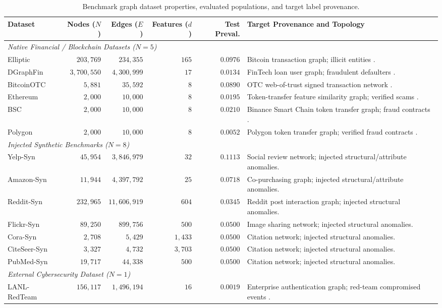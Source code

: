 \documentclass[11pt,a4paper]{article}
\begin{document}
\begin{table}[htbp]
\centering\small
\caption{Benchmark graph dataset properties, evaluated populations, and target label provenance.}
\label{tab:dataset_properties}
\begin{tabularx}{\textwidth}{lrrrrX}\toprule
\textbf{Dataset} & \textbf{Nodes ($N$)} & \textbf{Edges ($E$)} & \textbf{Features ($d$)} & \textbf{Test Preval.} & \textbf{Target Provenance and Topology} \\\midrule
\multicolumn{6}{l}{\textit{Native Financial / Blockchain Datasets ($N=5$)}} \\
Elliptic & $203,769$ & $234,355$ & $165$ & $0.0976$ & Bitcoin transaction graph; illicit entities \cite{weber2019elliptic}. \\
DGraphFin & $3,700,550$ & $4,300,999$ & $17$ & $0.0134$ & FinTech loan user graph; fraudulent defaulters \cite{huang2022dgraph}. \\
BitcoinOTC & $5,881$ & $35,592$ & $8$ & $0.0890$ & OTC web-of-trust signed transaction network \cite{kumar2016edge,snapbitcoinotc}. \\
Ethereum & $2,000$ & $10,000$ & $8$ & $0.0195$ & Token-transfer feature similarity graph; verified scams \cite{luo2024multichain}. \\
BSC & $2,000$ & $10,000$ & $8$ & $0.0210$ & Binance Smart Chain token transfer graph; fraud contracts \cite{luo2024multichain}. \\
Polygon & $2,000$ & $10,000$ & $8$ & $0.0052$ & Polygon token transfer graph; verified fraud contracts \cite{luo2024multichain}. \\\midrule
\multicolumn{6}{l}{\textit{Injected Synthetic Benchmarks ($N=8$)}} \\
Yelp-Syn & $45,954$ & $3,846,979$ & $32$ & $0.1113$ & Social review network; injected structural/attribute anomalies. \\
Amazon-Syn & $11,944$ & $4,397,792$ & $25$ & $0.0718$ & Co-purchasing graph; injected structural/attribute anomalies. \\
Reddit-Syn & $232,965$ & $11,606,919$ & $604$ & $0.0345$ & Reddit post interaction graph; injected structural anomalies. \\
Flickr-Syn & $89,250$ & $899,756$ & $500$ & $0.0500$ & Image sharing network; injected structural anomalies. \\
Cora-Syn & $2,708$ & $5,429$ & $1,433$ & $0.0500$ & Citation network; injected structural anomalies. \\
CiteSeer-Syn & $3,327$ & $4,732$ & $3,703$ & $0.0500$ & Citation network; injected structural anomalies. \\
PubMed-Syn & $19,717$ & $44,338$ & $500$ & $0.0500$ & Citation network; injected structural anomalies. \\\midrule
\multicolumn{6}{l}{\textit{External Cybersecurity Dataset ($N=1$)}} \\
LANL-RedTeam & $156,117$ & $1,496,194$ & $16$ & $0.0019$ & Enterprise authentication graph; red-team compromised events \cite{kent2015cyberdata}. \\\bottomrule
\end{tabularx}
\end{table}
\end{document}
